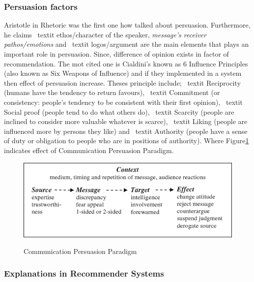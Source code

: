 \subsubsection{Persuasion factors}

Aristotle in Rhetoric \cite{gkika2014persuasive} was the first one how talked about persuasion. Furthermore, he claims \ textit { ethos/character of the speaker},  \textit { message’s receiver pathos/emotions} and \ textit{ logos/argument} are the main elements that plays an important role in persuasion. Since, difference of opinion exists in factor of recommendation. The mot cited one is  Cialdini’s \cite{cialdini2009influence} known as 6 Influence Principles (also known as Six Weapons of Influence) and if they implemented in a system then effect of persuasion increase. Theses principle include; \ textit{ Reciprocity} (humans have the tendency to return favours), \ textit{ Commitment }(or consistency: people’s tendency to be consistent with their first opinion), \ textit{ Social proof }(people tend to do what others do), \ textit{ Scarcity} (people are inclined to consider more valuable whatever is scarce), \ textit{ Liking }(people are influenced more by persons they like) and  \ textit{ Authority} (people have a sense of duty or obligation to people who are in positions of authority). Where Figure\ref{fig:ch2_communication_persuasion_paradigm} indicates effect of Communication Persuasion Paradigm\cite{yoo2012persuasive}.

\begin{figure}[h]
	\centering
	\includegraphics[width=1\linewidth]{figures/ch2_communication_persuasion_paradigm.png}
	\caption{Communication Persuasion Paradigm}
	\cite{yoo2012persuasive}
	\label{fig:ch2_communication_persuasion_paradigm}
\end{figure}

\newpage
\subsubsection{Explanations in Recommender Systems}

